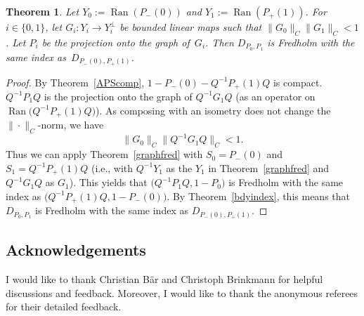 \documentclass[10pt,a4paper]{amsart}
\numberwithin{equation}{section}
\newtheorem{Theorem}{Theorem}[section]
\DeclareMathOperator{\Ran}{Ran}
\begin{document}
	\begin{Theorem}
		\label{finalgraph}
		Let $Y_0:=\Ran(P_-(0))$ and $Y_1:=\Ran(P_+(1))$. For $i\in \{0,1\}$, let
		$G_i\colon Y_i\rightarrow Y_i^\bot$
		be bounded linear maps such that
		$\|G_0\|_C\|G_1\|_C<1$.
		Let $P_i$ be the projection onto the graph of~$G_i$.
		Then $D_{P_0,P_1}$ is Fredholm with the same index as~$D_{P_-(0),P_+(1)}$.
	\end{Theorem}
	\begin{proof}
By Theorem~\ref{APScomp}, $1-P_-(0)-Q^{-1}P_+(1)Q$ is compact. $Q^{-1}P_1Q$ is the projection onto the graph of $Q^{-1}G_1Q$ \big(as an operator on $\Ran\bigl(Q^{-1}P_+(1)Q\bigr)$\big). As composing with an isometry does not change the  $\|\cdot\|_C$-norm, we have
		\[\|G_0\|_C\bigl\|Q^{-1}G_1Q\bigr\|_C<1.\]
		Thus we can apply Theorem~\ref{graphfred} with $S_0=P_-(0)$ and $S_1=Q^{-1}P_+(1)Q$ \big(i.e., with $Q^{-1}Y_1$ as the $Y_1$ in Theorem~\ref{graphfred} and $Q^{-1}G_1Q$ as $G_1$\big). This yields that $\bigl(Q^{-1}P_1Q,1-P_0\bigr)$ is Fredholm with the same index as $\bigl(Q^{-1}P_+(1)Q,1-P_-(0)\bigr)$. By Theorem~\ref{bdyindex}, this means that $D_{P_0,P_1}$ is Fredholm with the same index as $D_{P_-(0),P_+(1)}$.
	\end{proof}

\subsection*{Acknowledgements}
I would like to thank Christian B\"ar and Christoph Brinkmann for helpful discussions and feedback. Moreover, I would like to thank the anonymous referees for their detailed feedback.

\end{document}
